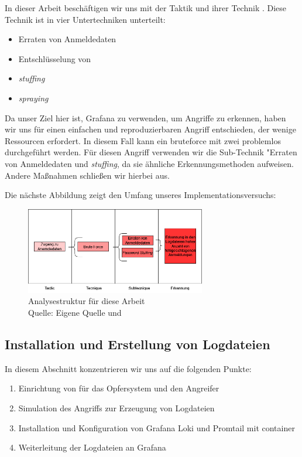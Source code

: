 In dieser Arbeit beschäftigen wir uns mit der Taktik  und ihrer Technik . Diese Technik ist in vier Untertechniken unterteilt:

{
\begin{itemize}[noitemsep]
   \item Erraten von Anmeldedaten 
   \item	Entschlüsselung von 
   \item \textit{\gls{stuffing}}
   \item \textit{\gls{spraying}}
\end{itemize}
}

Da unser Ziel hier ist, Grafana zu verwenden, um Angriffe zu erkennen, haben wir uns für einen einfachen und reproduzierbaren Angriff entschieden, der wenige Ressourcen erfordert. In diesem Fall kann ein \gls{bruteforce} mit zwei  problemlos durchgeführt werden. Für diesen Angriff verwenden wir die Sub-Technik "Erraten von Anmeldedaten und \textit{\gls{stuffing}}, da sie ähnliche Erkennungsmethoden aufweisen. Andere Maßnahmen schließen wir hierbei aus.

\newpage
Die nächste Abbildung zeigt den Umfang unseres Implementationsversuchs:
\begin{figure}[H]
   \centering
   \includegraphics[width=0.7\textwidth]{assets/T1110.drawio.png}
   \caption[Analysestruktur für diese Arbeit ]
   {Analysestruktur für diese Arbeit  \\Quelle: Eigene Quelle und \citep{Mitre_t1110}}
   \centering
\end{figure}

\subsection{Installation und Erstellung von Logdateien}
In diesem Abschnitt konzentrieren wir uns auf die folgenden Punkte:

\begin{enumerate}[noitemsep]
   \item Einrichtung von  für das Opfersystem und den Angreifer
   \item Simulation des Angriffs zur Erzeugung von Logdateien
   \item Installation und Konfiguration von Grafana Loki und Promtail mit \gls{container}
   \item Weiterleitung der Logdateien an Grafana
   \end{enumerate}

